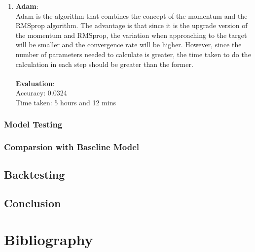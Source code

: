 \documentclass[11pt,a4paper]{article}
\begin{document}
    \begin{enumerate}
        \item
        {
            \textbf{Adam}: \\
            Adam is the algorithm that combines the concept of the momentum and the RMSprop algorithm. The advantage is that since it is the upgrade version of the momentum and RMSprop, the variation when approaching to the target will be smaller and the convergence rate will be higher. However, since the number of parameters needed to calculate is greater, the time taken to do the calculation in each step should be greater than the former. \\
            \\
            \textbf{Evaluation}: \\
            Accuracy: 0.0324 \\
            Time taken: 5 hours and 12 mins
        }
    \end{enumerate}
    
    \subsubsection{Model Testing}
    
    \subsubsection{Comparsion with Baseline Model}
    
    \subsection{Backtesting}
    
    \subsection{Conclusion}
    
    \newpage
    \section{Bibliography}
    
    
\end{document}
